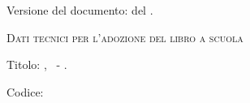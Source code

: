 {{\vspace{2ex}
Versione del documento: {\docvers} del {\oggi}.


\vspace{2ex}
{\scshape{Dati tecnici per l'adozione del libro a scuola}}

Titolo: \serie, \titolo\ - \anno.

Codice: \mcisbn 



\cleardoublepage
}}
